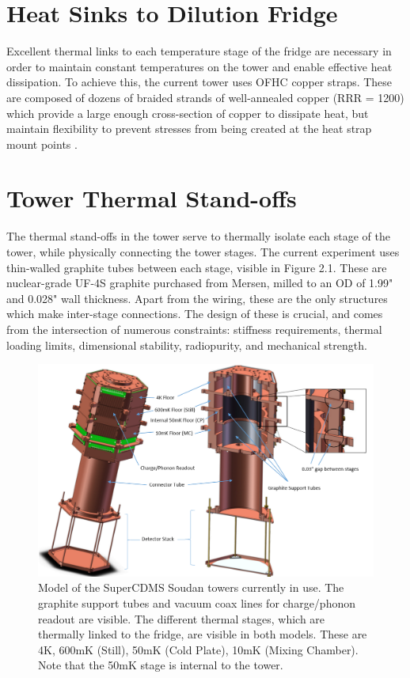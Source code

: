 \documentclass{report}
\begin{document}
\section{Heat Sinks to Dilution Fridge}

Excellent thermal links to each temperature stage of the fridge are necessary in order to maintain constant temperatures on the tower and enable effective heat dissipation. To achieve this, the current tower uses OFHC copper straps. These are composed of dozens of braided strands of well-annealed copper (RRR = 1200) which provide a large enough cross-section of copper to dissipate heat, but maintain flexibility to prevent stresses from being created at the heat strap mount points \cite{Stockwell1996}.


\section{Tower Thermal Stand-offs}

The thermal stand-offs in the tower serve to thermally isolate each stage of the tower, while physically connecting the tower stages. The current experiment uses thin-walled graphite tubes between each stage, visible in Figure 2.1. These are nuclear-grade UF-4S graphite purchased from Mersen, milled to an OD of 1.99" and 0.028" wall thickness. Apart from the wiring, these are the only structures which make inter-stage connections. The design of these is crucial, and comes from the intersection of numerous constraints: stiffness requirements, thermal loading limits, dimensional stability, radiopurity, and mechanical strength.

\begin{figure}[h]
\centering
\includegraphics[width = .75\textwidth]{Labelled_tower.png}
\caption{Model of the SuperCDMS Soudan towers currently in use. The graphite support tubes and vacuum coax lines for charge/phonon readout are visible. The different thermal stages, which are thermally linked to the fridge, are visible in both models. These are 4K, 600mK (Still), 50mK (Cold Plate), 10mK (Mixing Chamber). Note that the 50mK stage is internal to the tower.}
\end{figure}
\end{document}
